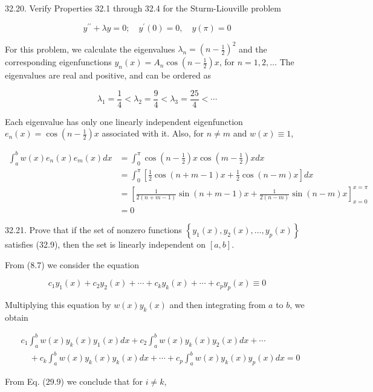 \documentclass[10pt]{article}
\begin{document}
32.20. Verify Properties 32.1 through 32.4 for the Sturm-Liouville problem

$$
y^{\prime \prime}+\lambda y=0 ; \quad y^{\prime}(0)=0, \quad y(\pi)=0
$$

For this problem, we calculate the eigenvalues $\lambda_{n}=\left(n-\frac{1}{2}\right)^{2}$ and the corresponding eigenfunctions $y_{n}(x)=A_{n} \cos \left(n-\frac{1}{2}\right) x$, for $n=1,2, \ldots$ The eigenvalues are real and positive, and can be ordered as

$$
\lambda_{1}=\frac{1}{4}<\lambda_{2}=\frac{9}{4}<\lambda_{3}=\frac{25}{4}<\cdots
$$

Each eigenvalue has only one linearly independent eigenfunction $e_{n}(x)=\cos \left(n-\frac{1}{2}\right) x$ associated with it. Also, for $n \neq m$ and $w(x) \equiv 1$,

$$
\begin{aligned}
\int_{a}^{b} w(x) e_{n}(x) e_{m}(x) d x & =\int_{0}^{\pi} \cos \left(n-\frac{1}{2}\right) x \cos \left(m-\frac{1}{2}\right) x d x \\
& =\int_{0}^{\pi}\left[\frac{1}{2} \cos (n+m-1) x+\frac{1}{2} \cos (n-m) x\right] d x \\
& =\left[\frac{1}{2(n+m-1)} \sin (n+m-1) x+\frac{1}{2(n-m)} \sin (n-m) x\right]_{x=0}^{x=\pi} \\
& =0
\end{aligned}
$$

32.21. Prove that if the set of nonzero functions $\left\{y_{1}(x), y_{2}(x), \ldots, y_{p}(x)\right\}$ satisfies (32.9), then the set is linearly independent on $[a, b]$.

From (8.7) we consider the equation


\begin{equation*}
c_{1} y_{1}(x)+c_{2} y_{2}(x)+\cdots+c_{k} y_{k}(x)+\cdots+c_{p} y_{p}(x) \equiv 0 \tag{1}
\end{equation*}


Multiplying this equation by $w(x) y_{k}(x)$ and then integrating from $a$ to $b$, we obtain

$$
\begin{aligned}
& c_{1} \int_{a}^{b} w(x) y_{k}(x) y_{1}(x) d x+c_{2} \int_{a}^{b} w(x) y_{k}(x) y_{2}(x) d x+\cdots \\
& \quad+c_{k} \int_{a}^{b} w(x) y_{k}(x) y_{k}(x) d x+\cdots+c_{p} \int_{a}^{b} w(x) y_{k}(x) y_{p}(x) d x=0
\end{aligned}
$$

From Eq. (29.9) we conclude that for $i \neq k$,
\end{document}
